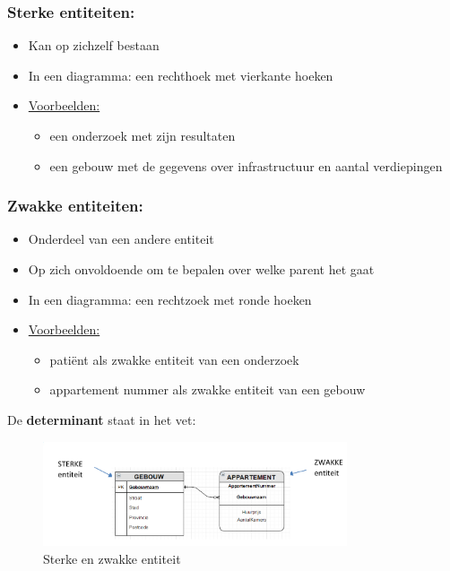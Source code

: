 \documentclass{article}
\newcommand{\bold}[1]{\textbf{#1}}
\begin{document}
\subsubsection{Sterke entiteiten:}
\begin{itemize}
    \item Kan op zichzelf bestaan
    \item In een diagramma: een rechthoek met vierkante hoeken
    \item \underline{Voorbeelden:} 
    \begin{itemize}
        \item een onderzoek met zijn resultaten
        \item een gebouw met de gegevens over infrastructuur en aantal verdiepingen
    \end{itemize}
\end{itemize}

\subsubsection{Zwakke entiteiten:}
\begin{itemize}
    \item Onderdeel van een andere entiteit
    \item Op zich onvoldoende om te bepalen over welke parent het gaat
    \item In een diagramma: een rechtzoek met ronde hoeken
    \item \underline{Voorbeelden:}
    \begin{itemize}
        \item patiënt als zwakke entiteit van een onderzoek
        \item appartement nummer als zwakke entiteit van een gebouw
    \end{itemize}
\end{itemize}

De \bold{determinant} staat in het vet:

\begin{figure}[H]
    \centering
    \includegraphics[width=0.8\textwidth]{Screenshot_20200318_144749.png}
    \caption{Sterke en zwakke entiteit}
\end{figure}
\end{document}

